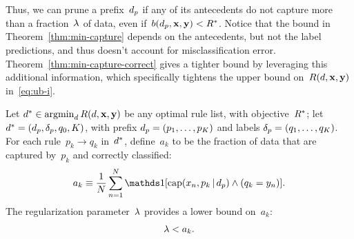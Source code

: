 Thus, we can prune a prefix~$d_p$ if any of its antecedents do not capture
more than a fraction~${\lambda}$ of data, even if~${b(d_p, \mathbf{x}, \mathbf{y}) < R^*}$.
%
Notice that the bound in Theorem~\ref{thm:min-capture}
depends on the antecedents, but not the label predictions,
and thus doesn't account for misclassification error.
%
Theorem~\ref{thm:min-capture-correct} gives a tighter bound
by leveraging this additional information, which specifically
tightens the upper bound on~$R({d}, \mathbf{x}, \mathbf{y})$ in~\eqref{eq:ub-i}.

\begin{theorem}
\label{thm:min-capture-correct}
Let ${d^* \in \operatorname*{argmin}_{d} R({d}, \mathbf{x}, \mathbf{y})}$
be any optimal rule list, with objective~$R^*$;
let ${d^* = (d_p, \delta_p, q_0, K)}$,
with prefix ${d_p = (p_1, \dots, p_K)}$
and labels ${\delta_p = (q_1, \dots, q_K)}$.
%
For each rule~${p_k \rightarrow q_k}$ in~$d^*$,
define~$a_k$ to be the fraction of data that are captured by~$p_k$
and correctly classified:
\begin{align}
a_k \equiv \frac{1}{N} \sum_{n=1}^N
  \one [ \Cap(x_n, p_k \given \Prefix) \wedge (q_k = y_n) ].
\label{eq:rule-correct}
\end{align}
The regularization parameter~${\lambda}$ provides a lower bound on~$a_k$:
\begin{align}
\Reg < a_k.
\label{eq:min-capture-correct}
\end{align}
\end{theorem}


